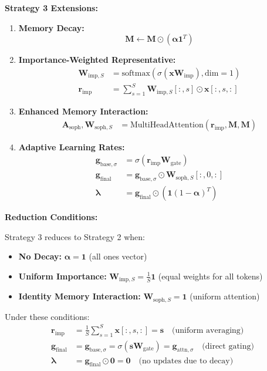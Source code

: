 \documentclass{article}
\begin{document}
\textbf{Strategy 3 Extensions:}
\begin{enumerate}
\item \textbf{Memory Decay:}
\begin{equation}
\mathbf{M} \leftarrow \mathbf{M} \odot (\boldsymbol{\alpha} \mathbf{1}^T)
\end{equation}

\item \textbf{Importance-Weighted Representative:}
\begin{align}
\mathbf{W}_{\text{imp},S} &= \text{softmax}(\sigma(\mathbf{x} \mathbf{W}_{\text{imp}}), \text{dim}=1) \\
\mathbf{r}_{\text{imp}} &= \sum_{s=1}^{S} \mathbf{W}_{\text{imp},S}[:, s] \odot \mathbf{x}[:, s, :]
\end{align}

\item \textbf{Enhanced Memory Interaction:}
\begin{align}
\mathbf{A}_{\text{soph}}, \mathbf{W}_{\text{soph},S} &= \text{MultiHeadAttention}(\mathbf{r}_{\text{imp}}, \mathbf{M}, \mathbf{M})
\end{align}

\item \textbf{Adaptive Learning Rates:}
\begin{align}
\mathbf{g}_{\text{base},\sigma} &= \sigma(\mathbf{r}_{\text{imp}} \mathbf{W}_{\text{gate}}) \\
\mathbf{g}_{\text{final}} &= \mathbf{g}_{\text{base},\sigma} \odot \mathbf{W}_{\text{soph},S}[:, 0, :] \\
\boldsymbol{\lambda} &= \mathbf{g}_{\text{final}} \odot (\mathbf{1} (1 - \boldsymbol{\alpha})^T)
\end{align}
\end{enumerate}

\textbf{Reduction Conditions:}

Strategy 3 reduces to Strategy 2 when:
\begin{itemize}
\item \textbf{No Decay:} $\boldsymbol{\alpha} = \mathbf{1}$ (all ones vector)
\item \textbf{Uniform Importance:} $\mathbf{W}_{\text{imp},S} = \frac{1}{S} \mathbf{1}$ (equal weights for all tokens)
\item \textbf{Identity Memory Interaction:} $\mathbf{W}_{\text{soph},S} = \mathbf{1}$ (uniform attention)
\end{itemize}

Under these conditions:
\begin{align}
\mathbf{r}_{\text{imp}} &= \frac{1}{S}\sum_{s=1}^{S} \mathbf{x}[:, s, :] = \mathbf{s} \quad \text{(uniform averaging)} \\
\mathbf{g}_{\text{final}} &= \mathbf{g}_{\text{base},\sigma} = \sigma(\mathbf{s} \mathbf{W}_{\text{gate}}) = \mathbf{g}_{\text{attn},\sigma} \quad \text{(direct gating)} \\
\boldsymbol{\lambda} &= \mathbf{g}_{\text{final}} \odot \mathbf{0} = \mathbf{0} \quad \text{(no updates due to decay)}
\end{align}
\end{document}
